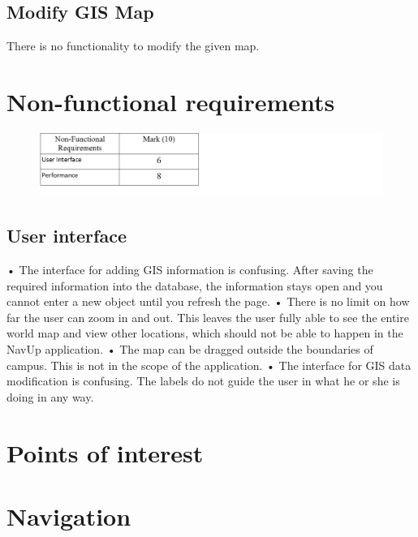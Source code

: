 \documentclass[english]{article}
\begin{document}
\subsection{Modify GIS Map}
There is no functionality to modify the given map.
\section{Non-functional requirements}
\begin{figure}[H]
\hspace*{-2.5cm} 
\includegraphics[width=180mm]{NFRMarks.png}
\end{figure}
\subsection{User interface}
•	The interface for adding GIS information is confusing. After saving the required information into the database, the information stays open and you cannot enter a new object until you refresh the page.
•	There is no limit on how far the user can zoom in and out. This leaves the user fully able to see the entire world map and view other locations, which should not be able to happen in the NavUp application.
•	The map can be dragged outside the boundaries of campus. This is not in the scope of the application.
•	The interface for GIS data modification is confusing. The labels do not guide the user in what he or she is doing in any way. 
\section{Points of interest}
\section{Navigation}
\end{document}
